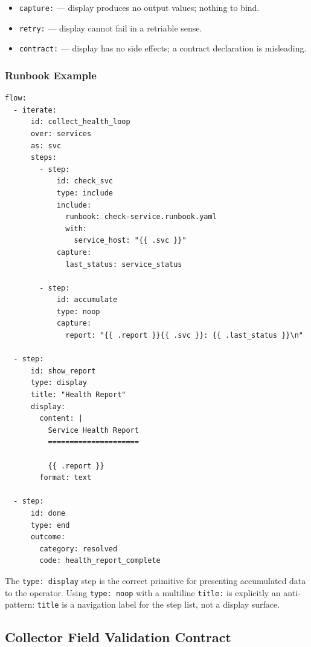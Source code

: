 \begin{itemize}
  \item \texttt{capture:} — display produces no output values; nothing to bind.
  \item \texttt{retry:} — display cannot fail in a retriable sense.
  \item \texttt{contract:} — display has no side effects; a contract declaration is misleading.
\end{itemize}

\subsubsection*{Runbook Example}

\begin{verbatim}
flow:
  - iterate:
      id: collect_health_loop
      over: services
      as: svc
      steps:
        - step:
            id: check_svc
            type: include
            include:
              runbook: check-service.runbook.yaml
              with:
                service_host: "{{ .svc }}"
            capture:
              last_status: service_status

        - step:
            id: accumulate
            type: noop
            capture:
              report: "{{ .report }}{{ .svc }}: {{ .last_status }}\n"

  - step:
      id: show_report
      type: display
      title: "Health Report"
      display:
        content: |
          Service Health Report
          =====================

          {{ .report }}
        format: text

  - step:
      id: done
      type: end
      outcome:
        category: resolved
        code: health_report_complete
\end{verbatim}

The \texttt{type: display} step is the correct primitive for presenting accumulated
data to the operator. Using \texttt{type: noop} with a multiline \texttt{title:} is
explicitly an anti-pattern: \texttt{title} is a navigation label for the step list,
not a display surface.

\subsection{Collector Field Validation Contract}
\label{sec:collector_field_validation_contract}

